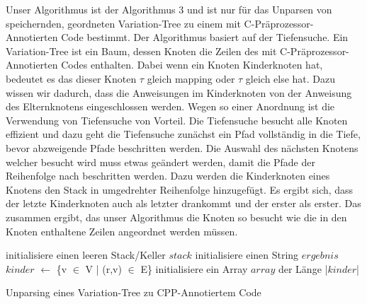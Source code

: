 Unser Algorithmus ist der Algorithmus 3 und ist nur für das Unparsen von speichernden, geordneten Variation-Tree zu einem mit C-Präprozessor-Annotierten Code bestimmt. Der Algorithmus basiert auf der Tiefensuche. Ein Variation-Tree ist ein Baum, dessen Knoten die Zeilen des  mit C-Präprozessor-Annotierten Codes enthalten. Dabei wenn ein Knoten Kinderknoten hat, bedeutet es das dieser Knoten $\tau$ gleich mapping oder $\tau$ gleich else hat. Dazu wissen wir dadurch, dass die Anweisungen im Kinderknoten von der Anweisung des Elternknotens eingeschlossen werden. Wegen so einer Anordnung ist die Verwendung von Tiefensuche von Vorteil. Die Tiefensuche besucht alle Knoten effizient und dazu geht die Tiefensuche zunächst ein Pfad vollständig in die Tiefe, bevor abzweigende Pfade beschritten werden. Die Auswahl des nächsten Knotens welcher besucht wird muss etwas geändert werden, damit die Pfade der Reihenfolge nach beschritten werden. Dazu werden die Kinderknoten eines Knotens den Stack in umgedrehter Reihenfolge hinzugefügt. Es ergibt sich, dass der letzte Kinderknoten auch als letzter drankommt und der erster als erster. Das zusammen ergibt, das unser Algorithmus die Knoten so besucht wie die in den Knoten enthaltene Zeilen angeordnet werden müssen.\\

\begin{algorithm}[H]
	\SetAlgoLined
	\DontPrintSemicolon
	initialisiere einen leeren Stack/Keller $stack$\;
	initialisiere einen String $ergebnis$\;
	$kinder$ $\leftarrow$  \{v $\in$ V | (r,v) $\in$ E\} \;
	initialisiere ein Array $array$ der Länge |$kinder$|\;
	\caption{Unparsing eines Variation-Tree zu CPP-Annotiertem Code}
\end{algorithm}

